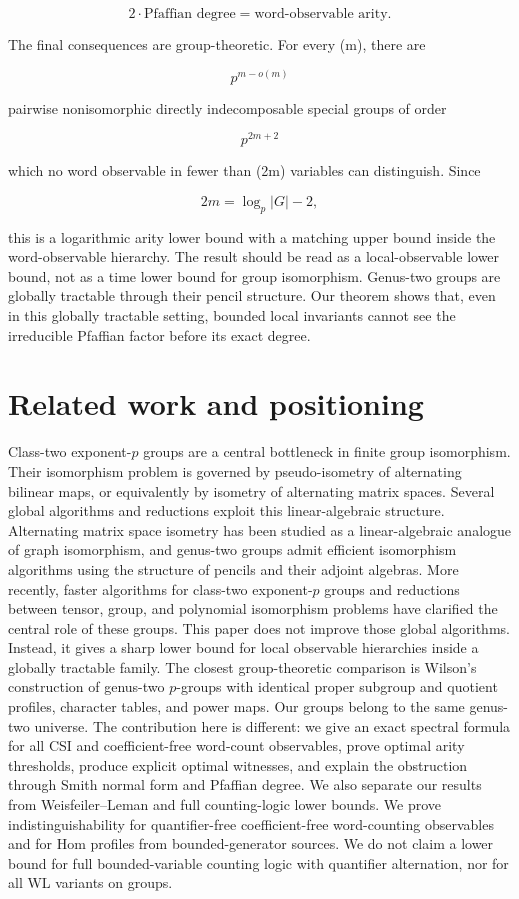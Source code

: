 \documentclass[11pt]{article}
\begin{document}
\[
\boxed{
2\cdot\text{Pfaffian degree}=
\text{word-observable arity}.
}
\]

The final consequences are group-theoretic. For every (m), there are

\[
p^{m-o(m)}
\]

pairwise nonisomorphic directly indecomposable special groups of order

\[
p^{2m+2}
\]

which no word observable in fewer than (2m) variables can distinguish. Since

\[
2m=\log_p |G|-2,
\]

this is a logarithmic arity lower bound with a matching upper bound inside the word-observable hierarchy. The result should be read as a local-observable lower bound, not as a time lower bound for group isomorphism. Genus-two groups are globally tractable through their pencil structure. Our theorem shows that, even in this globally tractable setting, bounded local invariants cannot see the irreducible Pfaffian factor before its exact degree.

\section{Related work and positioning}

Class-two exponent-$p$ groups are a central bottleneck in finite group isomorphism. Their isomorphism problem is governed by pseudo-isometry of alternating bilinear maps, or equivalently by isometry of alternating matrix spaces. Several global algorithms and reductions exploit this linear-algebraic structure. Alternating matrix space isometry has been studied as a linear-algebraic analogue of graph isomorphism, and genus-two groups admit efficient isomorphism algorithms using the structure of pencils and their adjoint algebras. More recently, faster algorithms for class-two exponent-$p$ groups and reductions between tensor, group, and polynomial isomorphism problems have clarified the central role of these groups. This paper does not improve those global algorithms. Instead, it gives a sharp lower bound for local observable hierarchies inside a globally tractable family. The closest group-theoretic comparison is Wilson's construction of genus-two $p$-groups with identical proper subgroup and quotient profiles, character tables, and power maps. Our groups belong to the same genus-two universe. The contribution here is different: we give an exact spectral formula for all CSI and coefficient-free word-count observables, prove optimal arity thresholds, produce explicit optimal witnesses, and explain the obstruction through Smith normal form and Pfaffian degree. We also separate our results from Weisfeiler--Leman and full counting-logic lower bounds. We prove indistinguishability for quantifier-free coefficient-free word-counting observables and for Hom profiles from bounded-generator sources. We do not claim a lower bound for full bounded-variable counting logic with quantifier alternation, nor for all WL variants on groups.
\end{document}
